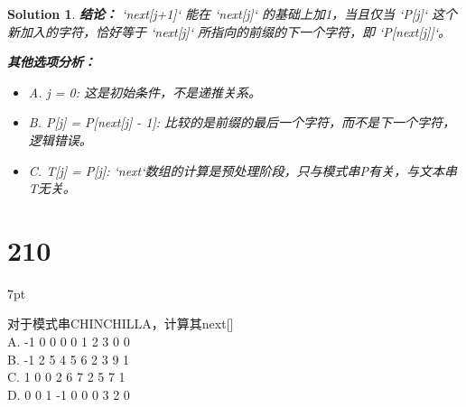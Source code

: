 \documentclass[UTF8]{report}
\newtheorem{solution}{Solution}
\theoremstyle{MyLineTheoremStyle} %
\theoremstyle{MyBlockTheoremStyle} %
\theoremstyle{MySubsubsectionStyle} %
\newenvironment{graybox}{%
        \def\FrameCommand{%
        \hspace{1pt}%
        {\color{gray}\small \vrule width 2pt}%
        {\color{graybox_color}\vrule width 4pt}%
        \colorbox{graybox_color}%
        }%
        \MakeFramed{\advance\hsize-\width\FrameRestore}%
        \noindent\hspace{-4.55pt}%
        \begin{adjustwidth}{}{7pt}%
        \vspace{2pt}\vspace{2pt}%
        }
        {%
        \vspace{2pt}\end{adjustwidth}\endMakeFramed%
        }
\begin{document}
\begin{solution}
\textbf{结论：}
`next[j+1]` 能在 `next[j]` 的基础上加1，当且仅当 `P[j]` 这个新加入的字符，恰好等于 `next[j]` 所指向的前缀的下一个字符，即 `P[next[j]]`。

\textbf{其他选项分析：}
\begin{itemize}
    \item A. j = 0: 这是初始条件，不是递推关系。
    \item B. P[j] = P[next[j] - 1]: 比较的是前缀的最后一个字符，而不是下一个字符，逻辑错误。
    \item C. T[j] = P[j]: `next`数组的计算是预处理阶段，只与模式串P有关，与文本串T无关。
\end{itemize}
\end{solution}

\section*{210}
\begin{graybox}
对于模式串CHINCHILLA，计算其next[]\\
A. -1 0 0 0 0 1 2 3 0 0\\
B. -1 2 5 4 5 6 2 3 9 1\\
C. 1 0 0 2 6 7 2 5 7 1\\
D. 0 0 1 -1 0 0 0 3 2 0
\end{graybox}
\end{document}
